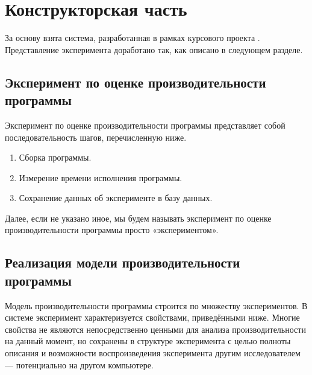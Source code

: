 \section{Конструкторская часть}

За основу взята система, разработанная в рамках курсового проекта \cite{adaptor}. Представление эксперимента доработано так, как описано в следующем разделе.

\subsection{Эксперимент по оценке производительности программы}

Эксперимент по оценке производительности программы представляет собой последовательность шагов, перечисленную ниже.

\begin{enumerate}
	\item Сборка программы.
	\item Измерение времени исполнения программы.
	\item Сохранение данных об эксперименте в базу данных.
\end{enumerate}

Далее, если не указано иное, мы будем называть эксперимент по оценке производительности программы просто «экспериментом».

\subsection{Реализация модели производительности программы}
\label{perf_mod_impl}

Модель производительности программы строится по множеству экспериментов. В системе эксперимент характеризуется свойствами, приведёнными ниже. Многие свойства не являются непосредственно ценными для анализа производительности на данный момент, но сохранены в структуре эксперимента с целью полноты описания и возможности воспроизведения эксперимента другим исследователем --- потенциально на другом компьютере.

